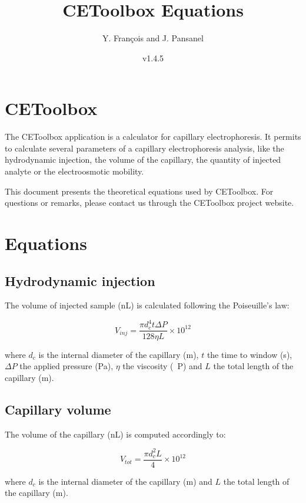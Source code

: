 \documentclass{article}
\title{CEToolbox Equations}
\author{Y. François and J. Pansanel}
\date{v1.4.5}
\begin{document}
\maketitle


\section{CEToolbox}

The CEToolbox application\citep{cetoolbox} is a calculator for capillary electrophoresis\citep{capillaryelectrophoresis}. It permits to calculate several parameters of a capillary electrophoresis analysis, like the hydrodynamic injection, the volume of the capillary, the quantity of injected analyte or the electroosmotic mobility.

This document presents the theoretical equations used by CEToolbox. For questions or remarks, please contact us through the CEToolbox project website.


\section{Equations}

\subsection{Hydrodynamic injection}

The volume of injected sample (\si{\nano\liter}) is calculated following the Poiseuille's law\citep{poiseuille}:

\[ V_{inj} = \frac{{\pi}d_c^4t{\Delta}P}{128{\eta}L} \times 10^{12} \]

where \(d_c\) is the internal diameter of the capillary (\si{\meter}), \(t\) the time to window (\si{\s}), \({\Delta}P\) the applied pressure (\si{\pascal}), \(\eta\) the viscosity (\si{{\centi}P}) and \(L\) the total length of the capillary (\si{\meter}).


\subsection{Capillary volume}

The volume of the capillary (\si{\nano\liter}) is computed accordingly to:

\[ V_{tot} = \frac{{\pi}d_c^2L}{4} \times 10^{12} \]

where \(d_c\) is the internal diameter of the capillary (\si{\meter}) and \(L\) the total length of the capillary (\si{\meter}).
\end{document}
